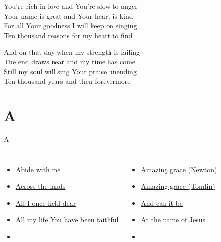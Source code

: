 \documentclass[aspectratio=169]{beamer}
\begin{document}
{\begin{frame}{}
\end{frame}
\hypertarget{10,000 reasons['Bless the Lord, O my soul']2}{}
\begin{frame}{}
\fontsize{20.0}{24.0}\selectfont

You're rich in love and You're slow to anger\\ 
Your name is great and Your heart is kind\\ 
For all Your goodness I will keep on singing\\ 
Ten thousand reasons for my heart to find

\end{frame}
\hypertarget{10,000 reasons['Bless the Lord, O my soul']3}{}
\begin{frame}{}
\fontsize{20.0}{24.0}\selectfont

And on that day when my strength is failing\\ 
The end draws near and my time has come\\ 
Still my soul will sing Your praise unending\\ 
Ten thousand years and then forevermore

\end{frame}
}

\section{ A }

\begin{frame}[t]{A}
\begin{columns}[t]
\begin{itemize}
    \item \hyperlink{Abide with me[]}{Abide with me}
    \item \hyperlink{Across the lands["You're the Word of God the Father"](Townend)}{Across the lands}
    \item \hyperlink{Knowing You['All I once held dear']}{All I once held dear}
    \item \hyperlink{Goodness of God['All my life You have been faithful']}{All my life You have been faithful}
    \item[] \phantom{1}
\end{itemize}
\begin{itemize}
    \item \hyperlink{Amazing grace[](Newton)}{Amazing grace (Newton)}
    \item \hyperlink{Amazing grace['My chains are gone'](Tomlin)}{Amazing grace (Tomlin)}
    \item \hyperlink{And can it be[]}{And can it be}
    \item \hyperlink{At the name of Jesus[]}{At the name of Jesus}
    \item[] \phantom{1}
\end{itemize}
\end{columns}
\end{frame}
\end{document}
